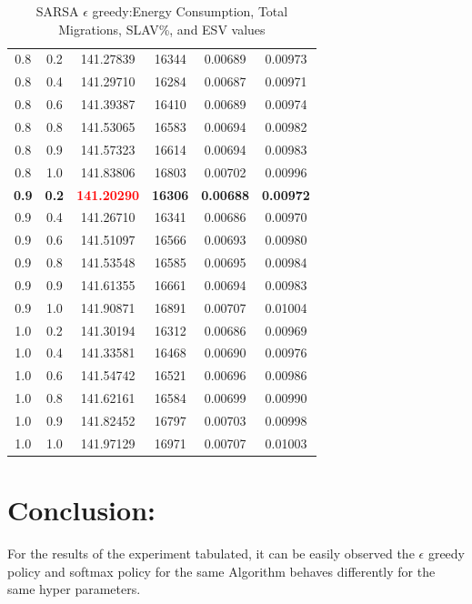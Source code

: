 \documentclass[a4paper,12pt]{Classes/RoboticsLaTeX}
\begin{document}
\begin{table}[H]
\begin{tabular}{|c|c|c|c|c|c|}
        0.8 & 0.2 & 141.27839 & 16344 & 0.00689 & 0.00973 \\ 
        0.8 & 0.4 & 141.29710 & 16284 & 0.00687 & 0.00971 \\ 
        0.8 & 0.6 & 141.39387 & 16410 & 0.00689 & 0.00974 \\ 
        0.8 & 0.8 & 141.53065 & 16583 & 0.00694 & 0.00982 \\ 
        0.8 & 0.9 & 141.57323 & 16614 & 0.00694 & 0.00983 \\ 
        0.8 & 1.0 & 141.83806 & 16803 & 0.00702 & 0.00996 \\ 
        \textbf{0.9} & \textbf{0.2} & \textbf{\textcolor{red}{141.20290}} & \textbf{16306} & \textbf{0.00688} & \textbf{0.00972} \\ 
        0.9 & 0.4 & 141.26710 & 16341 & 0.00686 & 0.00970 \\ 
        0.9 & 0.6 & 141.51097 & 16566 & 0.00693 & 0.00980 \\ 
        0.9 & 0.8 & 141.53548 & 16585 & 0.00695 & 0.00984 \\ 
        0.9 & 0.9 & 141.61355 & 16661 & 0.00694 & 0.00983 \\ 
        0.9 & 1.0 & 141.90871 & 16891 & 0.00707 & 0.01004 \\ 
        1.0 & 0.2 & 141.30194 & 16312 & 0.00686 & 0.00969 \\
        1.0 & 0.4 & 141.33581 & 16468 & 0.00690 & 0.00976 \\ 
        1.0 & 0.6 & 141.54742 & 16521 & 0.00696 & 0.00986 \\ 
        1.0 & 0.8 & 141.62161 & 16584 & 0.00699 & 0.00990 \\ 
        1.0 & 0.9 & 141.82452 & 16797 & 0.00703 & 0.00998 \\ 
        1.0 & 1.0 & 141.97129 & 16971 & 0.00707 & 0.01003 \\ 
        \hline
        \end{tabular}
        \caption{SARSA $\epsilon$ greedy:Energy Consumption, Total Migrations, SLAV\%, and ESV values}
        \end{table}      

        \section{Conclusion:}
        For the results of the experiment tabulated, it can be easily observed the $\epsilon$ greedy policy and softmax policy for the same Algorithm  behaves differently for the same hyper parameters.
        
\end{document}
